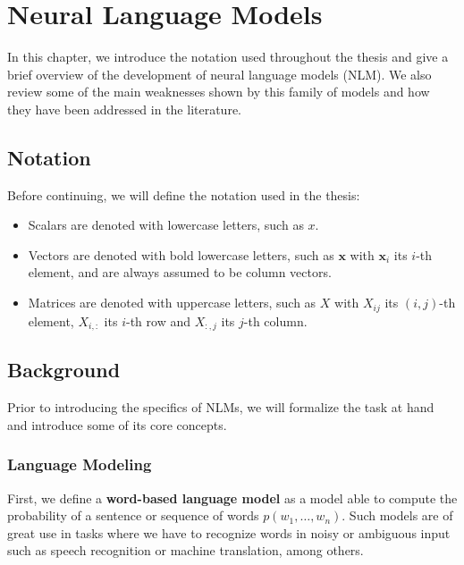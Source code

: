 \chapter{Neural Language Models}

In this chapter, we introduce the notation used throughout the thesis and give a brief overview of the development of neural language models (NLM). We also review some of the main weaknesses shown by this family of models and how they have been addressed in the literature. 

\section{Notation}
\label{sec:notation}

Before continuing, we will define the notation used in the thesis:

\begin{itemize}
	\item Scalars are denoted with lowercase letters, such as $x$.
	
	\item Vectors are denoted with bold lowercase letters, such as $\mathbf{x}$ with $\mathbf{x}_i$ its $i$-th element, and are always assumed to be column vectors.
	
	\item Matrices are denoted with uppercase letters, such as $X$ with $X_{ij}$ its $(i,j)$-th element, $X_{i,:}$ its $i$-th row and $X_{:,j}$ its $j$-th column.
\end{itemize}

\section{Background}
\label{sec:background}

Prior to introducing the specifics of NLMs, we will formalize the task at hand and introduce some of its core concepts. 

\subsection{Language Modeling}

First, we define a \textbf{word-based language model} as a model able to compute the probability of a sentence or sequence of words $p(w_1, \ldots ,w_n)$. Such models are of great use in tasks where we have to recognize words in noisy or ambiguous input such as speech recognition or machine translation, among others.

